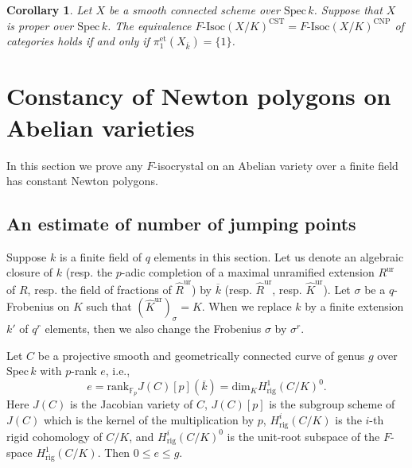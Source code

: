 \documentclass[11pt]{amsart}
\newtheorem{corollary}[Lemma]{Corollary}
\begin{document}
\begin{corollary}\label{van} 
Let $X$ be a smooth connected scheme over $\mathrm{Spec}\, k$. 
Suppose that $X$ is proper over $\mathrm{Spec}\, k$. 
The equivalence $F\mbox{-}\mathrm{Isoc}(X/K)^{\mathrm{CST}} = F\mbox{-}\mathrm{Isoc}(X/K)^{\mathrm{CNP}}$ 
of categories holds if and only if $\pi_1^{\mathrm{et}}(X_{\overline{k}}) = \{ 1 \}$. 
\end{corollary}

\section{Constancy of Newton polygons on Abelian varieties} 
In this section we prove any $F$-isocrystal on an Abelian variety over a finite field 
has constant Newton polygons. 

\subsection{An estimate of number of jumping points}

Suppose $k$ is a finite field of $q$ elements in this section. 
Let us denote an algebraic closure of $k$ (resp. the $p$-adic completion of a maximal unramified extension $R^{\mathrm{ur}}$ of $R$, 
resp. the field of fractions of $\widehat{R}^{\mathrm{ur}}$) 
by $\overline{k}$ (resp. $\widehat{R}^{\mathrm{ur}}$, resp. $\widehat{K}^{\mathrm{ur}}$). 
Let $\sigma$ be a $q$-Frobenius on $K$ such that $(\widehat{K}^{\mathrm{ur}})_\sigma = K$. 
When we replace $k$ by a finite extension $k'$ of $q^r$ elements, then we also change 
the Frobenius $\sigma$ by $\sigma^r$. 

Let $C$ be a projective smooth and geometrically connected curve of genus $g$ over $\mathrm{Spec}\, k$ 
with $p$-rank $e$, i.e., 
$$
   e = \mathrm{rank}_{\mathbb F_p}J(C)[p](\overline{k}) = \mathrm{dim}_KH^1_{\mathrm{rig}}(C/K)^0.
$$
Here $J(C)$ is the Jacobian variety of $C$, $J(C)[p]$ is the subgroup scheme of $J(C)$ 
which is the kernel of the multiplication by $p$, $H^i_{\mathrm{rig}}(C/K)$ 
is the $i$-th rigid cohomology of $C/K$, and $H^i_{\mathrm{rig}}(C/K)^0$ 
is the unit-root subspace of the $F$-space $H^1_{\mathrm{rig}}(C/K)$. 
Then $0 \leq e \leq g$. 
\end{document}
